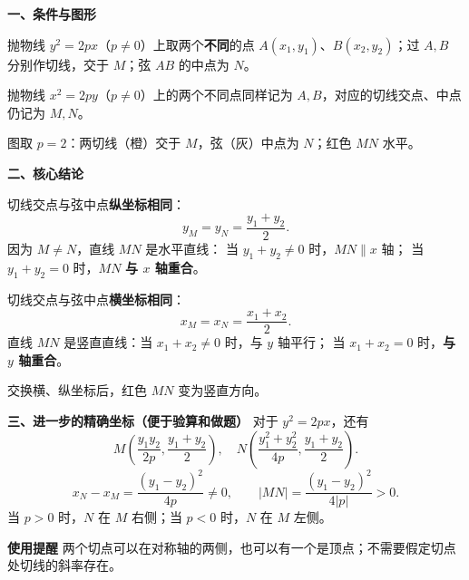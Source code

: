 \begin{statementbox}
\textbf{\textcolor{CStatement}{一、条件与图形}}
\begin{description}[style=nextline,leftmargin=2.8em,labelsep=0.5em,itemsep=0.4em]
  \item[\textbf{条件一（横轴方向的抛物线）：}]
  抛物线 $y^2=2px$（$p\ne0$）上取两个\textbf{不同}的点
  $A(x_1,y_1)$、$B(x_2,y_2)$；过 $A,B$ 分别作切线，交于 $M$；弦 $AB$ 的中点为 $N$。
  \item[\textbf{条件二（纵轴方向的抛物线）：}]
  抛物线 $x^2=2py$（$p\ne0$）上的两个不同点同样记为 $A,B$，对应的切线交点、中点仍记为 $M,N$。
\end{description}

\par\noindent\begin{minipage}{\linewidth}
\begin{center}


图取 $p=2$：两切线（橙）交于 $M$，弦（灰）中点为 $N$；红色 $MN$ 水平。
\end{center}
\end{minipage}\par

\textbf{\textcolor{CStatement}{二、核心结论}}
\begin{description}[style=nextline,leftmargin=2.8em,labelsep=0.5em,itemsep=0.45em]
  \item[\textbf{结论一（$y^2=2px$）：}]
  切线交点与弦中点\textbf{纵坐标相同}：
  \[
    \boxed{y_M=y_N=\frac{y_1+y_2}{2}}.
  \]
  因为 $M\ne N$，直线 $MN$ 是水平直线：
  当 $y_1+y_2\ne0$ 时，$MN\parallel x$ 轴；
  当 $y_1+y_2=0$ 时，$MN$ \textbf{与 $x$ 轴重合}。
  \item[\textbf{结论二（$x^2=2py$）：}]
  切线交点与弦中点\textbf{横坐标相同}：
  \[
    \boxed{x_M=x_N=\frac{x_1+x_2}{2}}.
  \]
  直线 $MN$ 是竖直直线：当 $x_1+x_2\ne0$ 时，与 $y$ 轴平行；
  当 $x_1+x_2=0$ 时，\textbf{与 $y$ 轴重合}。
\end{description}

\par\noindent\begin{minipage}{\linewidth}
\begin{center}


交换横、纵坐标后，红色 $MN$ 变为竖直方向。
\end{center}
\end{minipage}\par

\textbf{\textcolor{CStatement}{三、进一步的精确坐标（便于验算和做题）}}
对于 $y^2=2px$，还有
\[
\boxed{M\left(\frac{y_1y_2}{2p},\frac{y_1+y_2}{2}\right),\quad
N\left(\frac{y_1^2+y_2^2}{4p},\frac{y_1+y_2}{2}\right).}
\]
\[
\boxed{x_N-x_M=\frac{(y_1-y_2)^2}{4p}\ne0,\qquad
|MN|=\frac{(y_1-y_2)^2}{4|p|}>0.}
\]
当 $p>0$ 时，$N$ 在 $M$ 右侧；当 $p<0$ 时，$N$ 在 $M$ 左侧。

\medskip
\textbf{\textcolor{CStatement}{使用提醒}}
两个切点可以在对称轴的两侧，也可以有一个是顶点；不需要假定切点处切线的斜率存在。
\end{statementbox}

